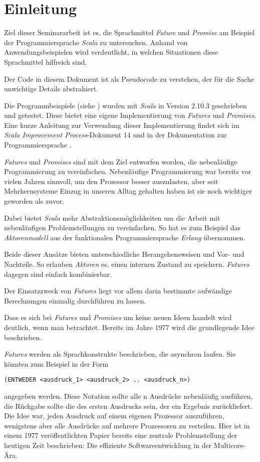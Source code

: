 \section{Einleitung}

Ziel dieser Seminararbeit ist es, die Sprachmittel \emph{Future}
und \emph{Promise} am Beispiel der Programmiersprache \emph{Scala}
zu untersuchen. Anhand von Anwendungsbeispielen wird verdeutlicht, 
in welchen Situationen diese Sprachmittel hilfreich sind.

Der Code in diesem Dokument ist als Pseudocode zu verstehen, der für die
Sache unwichtige Details abstrahiert.

Die Programmbeispiele (siehe \cite{code}) wurden mit
\emph{Scala} in Version 2.10.3 geschrieben und getestet. Diese bietet
eine eigene Implementierung von \emph{Futures} und \emph{Promises}.
Eine kurze Anleitung zur Verwendung dieser Implementierung findet sich im
\emph{Scala Improvement Process}-Dokument 14 \cite{sip14}
und in der Dokumentation zur Programmiersprache \cite{scalaDokuFP}.

\emph{Futures} und \emph{Promises} sind mit dem Ziel entworfen worden,
die nebenläufige Programmierung zu vereinfachen. Nebenläufige Programmierung
war bereits vor vielen Jahren sinnvoll, um den Prozessor besser auszulasten,
aber seit Mehrkernsysteme Einzug in unseren Alltag gehalten haben
ist sie noch wichtiger geworden als zuvor.

Dabei bietet \emph{Scala} mehr Abstraktionsmöglichkeiten um die Arbeit
mit nebenläufigen Problemstellungen zu vereinfachen. So hat es zum
Beispiel das \emph{Aktorenmodell} aus der funktionalen Programmiersprache
\emph{Erlang} übernommen.

Beide dieser Ansätze bieten unterschiedliche Herangehensweisen und
Vor- und Nachteile. So erlauben \emph{Aktoren} es, einen internen Zustand
zu speichern. \emph{Futures} dagegen sind einfach kombinierbar.

Der Einsatzzweck von \emph{Futures} liegt vor allem darin bestimmte
aufwändige Berechnungen einmalig durchführen zu lassen.

Dass es sich bei \emph{Futures} und \emph{Promises} um keine neuen
Ideen handelt wird deutlich, wenn man \cite{Baker:1977:IGC:872734.806932}
betrachtet. Bereits im Jahre 1977 wird die grundlegende Idee beschrieben.

\emph{Futures} werden als Sprachkonstrukte beschrieben, die asynchron laufen. Sie 
könnten zum Beispiel in der Form 
\begin{lstlisting}
(ENTWEDER <ausdruck_1> <ausdruck_2> .. <ausdruck_n>)
\end{lstlisting}
angegeben werden. Diese Notation sollte alle n Ausdrücke nebenläufig ausführen, 
die Rückgabe sollte die des ersten Ausdrucks sein, der ein Ergebnis zurückliefert.
Die Idee war, jeden Ausdruck auf einem eigenen Prozessor auszuführen, 
wenigstens aber alle Ausdrücke auf mehrere Prozessoren zu verteilen. Hier ist in 
einem 1977 veröffentlichten Papier bereits eine zentrale Problemstellung der 
heutigen Zeit beschrieben: Die effiziente Softwareentwicklung in der Multicore-Ära.

